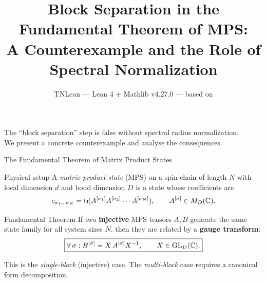 \documentclass[aspectratio=169,10pt]{beamer}
\title{\textbf{Block Separation in the Fundamental Theorem of MPS:\\A Counterexample and the Role of Spectral Normalization}}
\subtitle{{\small TNLean --- Lean 4 + Mathlib v4.27.0 --- based on \cite{Perez-Garcia2007Matrix,Cirac2021Matrix}}}
\date{}
\author{}
\begin{document}
{%
\begin{frame}
    \vspace{-1.5em}
    \maketitle
    \vspace{-3em}
    \begin{center}
        {\footnotesize
            \textcolor{dimwhite}{%
            The ``block separation'' step is \textcolor{softred}{false}
            without spectral radius normalization.\\
            We present a concrete counterexample and analyse the consequences.}}
    \end{center}
\end{frame}
}

\begin{frame}{The Fundamental Theorem of Matrix Product States}
\vspace{-0.5em}

\begin{block}{Physical setup}
A \emph{matrix product state} (MPS) on a spin chain of length $N$ with
local dimension $d$ and bond dimension $D$ is a state whose coefficients are
\[
  c_{\sigma_1 \dots \sigma_N}
  = 
  \mathrm{tr}\!(A^{[\sigma_1]} A^{[\sigma_2]} \cdots A^{[\sigma_N]}),
  \qquad
  A^{[\sigma]} \in M_D(\mathbb{C}).
\]
\end{block}

\begin{block}{Fundamental Theorem \cite{Perez-Garcia2007Matrix}}
If two \textbf{injective} MPS tensors $A, B$ generate the same state family
for all system sizes $N$, then they are related by a \textbf{gauge transform}:
\[
  \boxed{ 
  \forall\,\sigma: 
  B^{[\sigma]} = X\, A^{[\sigma]} X^{-1},
  \qquad X \in \mathrm{GL}_D(\mathbb{C}).
  }
\]
\end{block}

\vspace{0.3em}
\textcolor{dimwhite}{\footnotesize%
This is the \emph{single-block} (injective) case.
The \emph{multi-block} case requires a canonical form decomposition.}
\end{frame}
\end{document}

